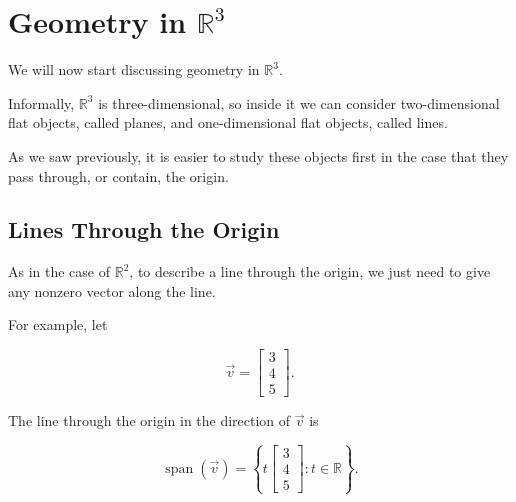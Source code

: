 
\section{Geometry in $\mathbb{R}^3$}

We will now start discussing geometry in $\mathbb{R}^3$.

Informally, $\mathbb{R}^3$ is three-dimensional, so inside it we can consider
two-dimensional flat objects, called planes, and one-dimensional flat objects,
called lines.

As we saw previously, it is easier to study these objects first in the case
that they pass through, or contain, the origin.

\subsection{Lines Through the Origin}

As in the case of $\mathbb{R}^2$, to describe a line through the origin, we
just need to give any nonzero vector along the line.

For example, let

\[
\vec v=
\begin{bmatrix}
3\\
4\\
5
\end{bmatrix}.
\]

The line through the origin in the direction of $\vec v$ is

\[
\operatorname{span}(\vec v)
=
\left\{
t
\begin{bmatrix}
3\\
4\\
5
\end{bmatrix}
:
t\in\mathbb{R}
\right\}.
\]

